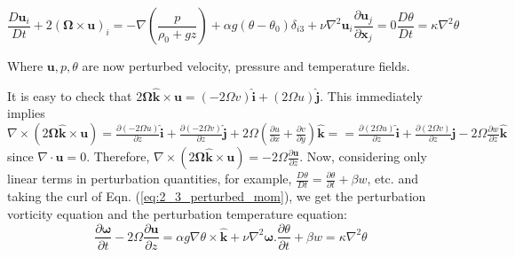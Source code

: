 \documentclass{article}
\begin{document}
\begin{subequations} \label{eq:2_3_perturbed}
 \begin{equation}\label{eq:2_3_perturbed_mom}
  \frac{D\boldsymbol{u}_{i}}{Dt} + 2 (\boldsymbol{\Omega} \times \boldsymbol{u})_{i} = -\nabla \left(\frac{p}{\rho_{0} + gz}\right) + \alpha g (\theta - \theta_{0}) \delta_{i3} + \nu \nabla^{2} \boldsymbol{u}_{i}
 \end{equation}
 \begin{equation}
  \frac{\partial \boldsymbol{u}_{j}}{\partial \boldsymbol{x}_{j}} = 0
 \end{equation}
 \begin{equation}
  \frac{D\theta}{Dt} = \kappa \nabla^{2} \theta
 \end{equation}
\end{subequations}

Where $\boldsymbol{u}, p, \theta$ are now perturbed velocity, pressure and temperature fields. 

It is easy to check that $2\boldsymbol{\Omega \hat{k}} \times \boldsymbol{u} =  (-2\Omega v)\boldsymbol{\hat{i}} + (2\Omega u)\boldsymbol{\hat{j}}$. This immediately implies  $\nabla \times (2\boldsymbol{\Omega \hat{k}} \times \boldsymbol{u}) = \frac{\partial (-2\Omega u)}{\partial z} \boldsymbol{\hat{i}} + \frac{\partial (-2\Omega v)}{\partial z} \boldsymbol{\hat{j}}  + 2\Omega\left(\frac{\partial u}{\partial x} + \frac{\partial v}{\partial y}\right) \boldsymbol{\hat{k}} = = \frac{\partial (2\Omega u)}{\partial z} \boldsymbol{\hat{i}} + \frac{\partial (2\Omega v)}{\partial z} \boldsymbol{\hat{j}}  - 2\Omega\frac{\partial w}{\partial z} \boldsymbol{\hat{k}}$ since $\nabla \cdot \boldsymbol{u} = 0$. Therefore, $\nabla \times (2\boldsymbol{\Omega \hat{k}} \times \boldsymbol{u}) = -2\Omega \frac{\partial \boldsymbol{u}}{\partial z}$. Now, considering only linear terms in perturbation quantities, for example,
$\frac{D\theta}{Dt} = \frac{\partial \theta}{\partial t} + \beta w$, etc. and taking the curl of Eqn. (\ref{eq:2_3_perturbed_mom}), we get the perturbation vorticity equation and the perturbation temperature equation:
\begin{subequations}
 \begin{equation}\label{eq:2_3_perturbed_vorticity}
\frac{\partial \boldsymbol{\omega}}{\partial t} - 2\Omega\frac{\partial \boldsymbol{u}}{\partial {z}} = \alpha g \nabla \theta \times \boldsymbol{\hat{k}} + \nu \nabla^{2} \boldsymbol{\omega}.  
 \end{equation}
 \begin{equation} \label{eq:2_3_perturbed_energy}
  \frac{\partial \theta}{\partial t} + \beta w = \kappa \nabla^{2} \theta
 \end{equation}
\end{subequations}
\end{document}
